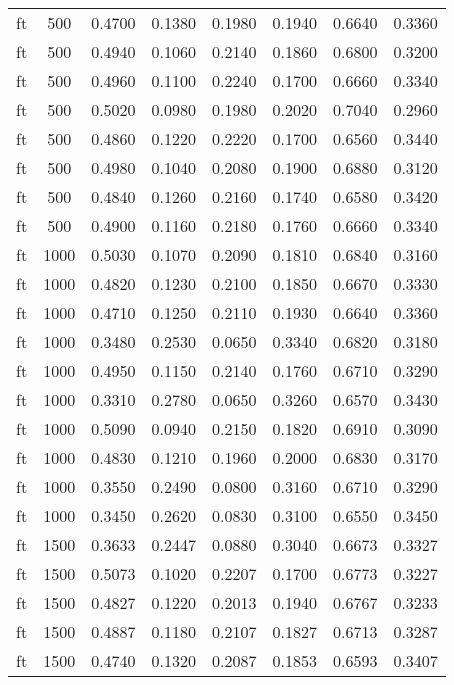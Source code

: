 \begin{scriptsize}
\begin{longtable}{cccccccc}
	ft       & 500  & 0.4700 & 0.1380 & 0.1980 & 0.1940 & 0.6640 & 0.3360 \\
	ft       & 500  & 0.4940 & 0.1060 & 0.2140 & 0.1860 & 0.6800 & 0.3200 \\
	ft       & 500  & 0.4960 & 0.1100 & 0.2240 & 0.1700 & 0.6660 & 0.3340 \\
	ft       & 500  & 0.5020 & 0.0980 & 0.1980 & 0.2020 & 0.7040 & 0.2960 \\
	ft       & 500  & 0.4860 & 0.1220 & 0.2220 & 0.1700 & 0.6560 & 0.3440 \\
	ft       & 500  & 0.4980 & 0.1040 & 0.2080 & 0.1900 & 0.6880 & 0.3120 \\
	ft       & 500  & 0.4840 & 0.1260 & 0.2160 & 0.1740 & 0.6580 & 0.3420 \\
	ft       & 500  & 0.4900 & 0.1160 & 0.2180 & 0.1760 & 0.6660 & 0.3340 \\
	ft       & 1000 & 0.5030 & 0.1070 & 0.2090 & 0.1810 & 0.6840 & 0.3160 \\
	ft       & 1000 & 0.4820 & 0.1230 & 0.2100 & 0.1850 & 0.6670 & 0.3330 \\
	ft       & 1000 & 0.4710 & 0.1250 & 0.2110 & 0.1930 & 0.6640 & 0.3360 \\
	ft       & 1000 & 0.3480 & 0.2530 & 0.0650 & 0.3340 & 0.6820 & 0.3180 \\
	ft       & 1000 & 0.4950 & 0.1150 & 0.2140 & 0.1760 & 0.6710 & 0.3290 \\
	ft       & 1000 & 0.3310 & 0.2780 & 0.0650 & 0.3260 & 0.6570 & 0.3430 \\
	ft       & 1000 & 0.5090 & 0.0940 & 0.2150 & 0.1820 & 0.6910 & 0.3090 \\
	ft       & 1000 & 0.4830 & 0.1210 & 0.1960 & 0.2000 & 0.6830 & 0.3170 \\
	ft       & 1000 & 0.3550 & 0.2490 & 0.0800 & 0.3160 & 0.6710 & 0.3290 \\
	ft       & 1000 & 0.3450 & 0.2620 & 0.0830 & 0.3100 & 0.6550 & 0.3450 \\
	ft       & 1500 & 0.3633 & 0.2447 & 0.0880 & 0.3040 & 0.6673 & 0.3327 \\
	ft       & 1500 & 0.5073 & 0.1020 & 0.2207 & 0.1700 & 0.6773 & 0.3227 \\
	ft       & 1500 & 0.4827 & 0.1220 & 0.2013 & 0.1940 & 0.6767 & 0.3233 \\
	ft       & 1500 & 0.4887 & 0.1180 & 0.2107 & 0.1827 & 0.6713 & 0.3287 \\
	ft       & 1500 & 0.4740 & 0.1320 & 0.2087 & 0.1853 & 0.6593 & 0.3407 \\

\end{longtable}
\end{scriptsize}
